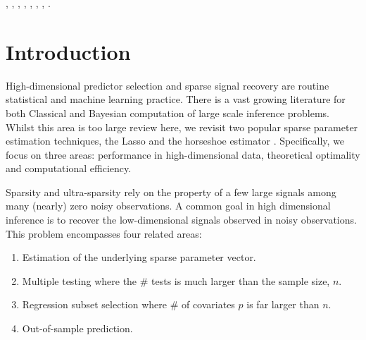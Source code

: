 \documentclass[sts,preprint]{imsart}
\begin{document}
\begin{frontmatter}
\begin{keyword}[class=MSC]
 , , , , , , , .
\end{keyword}


\end{frontmatter}

\section{Introduction}

High-dimensional predictor selection and sparse signal recovery are routine statistical and machine learning practice. 
There is a vast growing literature for both Classical and Bayesian computation of large scale inference problems. Whilst this area is 
too large review here, we revisit two popular sparse parameter estimation techniques, the Lasso \citep{tibshirani96} and the horseshoe 
estimator \citep{carvalho2010horseshoe}. Specifically, we focus on three areas: performance in high-dimensional data, theoretical 
optimality and computational efficiency. 

Sparsity and ultra-sparsity rely on the property of a few large signals among many (nearly) zero noisy observations. 
A common goal in high dimensional inference is to recover the low-dimensional signals observed in noisy observations. 
This problem encompasses four related areas: 

\begin{enumerate}
  \item Estimation of the underlying sparse parameter vector. 
  \item Multiple testing where the \# tests is much larger than the sample size, $n$. 
  \item Regression subset selection where \# of covariates $p$ is far larger than $n$. 
	\item Out-of-sample prediction. 
\end{enumerate}
\end{document}
